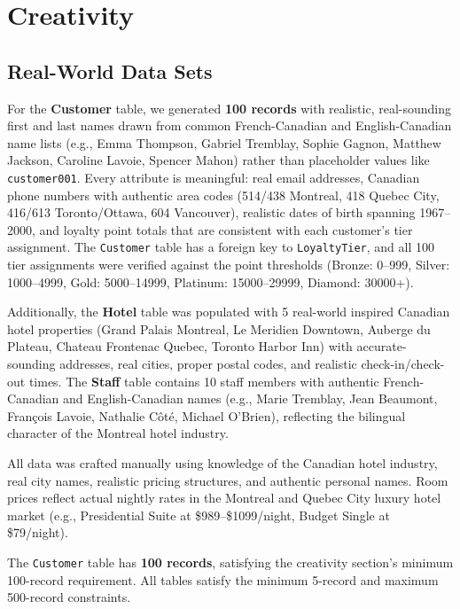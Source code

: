 \documentclass[12pt,letterpaper]{article}
\begin{document}
\section{Creativity}

\subsection{Real-World Data Sets}

For the \textbf{Customer} table, we generated \textbf{100 records} with realistic, real-sounding first and last names drawn from common French-Canadian and English-Canadian name lists (e.g., Emma Thompson, Gabriel Tremblay, Sophie Gagnon, Matthew Jackson, Caroline Lavoie, Spencer Mahon) rather than placeholder values like \texttt{customer001}. Every attribute is meaningful: real email addresses, Canadian phone numbers with authentic area codes (514/438 Montreal, 418 Quebec City, 416/613 Toronto/Ottawa, 604 Vancouver), realistic dates of birth spanning 1967--2000, and loyalty point totals that are consistent with each customer's tier assignment. The \texttt{Customer} table has a foreign key to \texttt{LoyaltyTier}, and all 100 tier assignments were verified against the point thresholds (Bronze: 0--999, Silver: 1000--4999, Gold: 5000--14999, Platinum: 15000--29999, Diamond: 30000+).

Additionally, the \textbf{Hotel} table was populated with 5 real-world inspired Canadian hotel properties (Grand Palais Montreal, Le Meridien Downtown, Auberge du Plateau, Chateau Frontenac Quebec, Toronto Harbor Inn) with accurate-sounding addresses, real cities, proper postal codes, and realistic check-in/check-out times. The \textbf{Staff} table contains 10 staff members with authentic French-Canadian and English-Canadian names (e.g., Marie Tremblay, Jean Beaumont, François Lavoie, Nathalie Côté, Michael O'Brien), reflecting the bilingual character of the Montreal hotel industry.

All data was crafted manually using knowledge of the Canadian hotel industry, real city names, realistic pricing structures, and authentic personal names. Room prices reflect actual nightly rates in the Montreal and Quebec City luxury hotel market (e.g., Presidential Suite at \$989--\$1099/night, Budget Single at \$79/night).

The \texttt{Customer} table has \textbf{100 records}, satisfying the creativity section's minimum 100-record requirement. All tables satisfy the minimum 5-record and maximum 500-record constraints.
\end{document}
